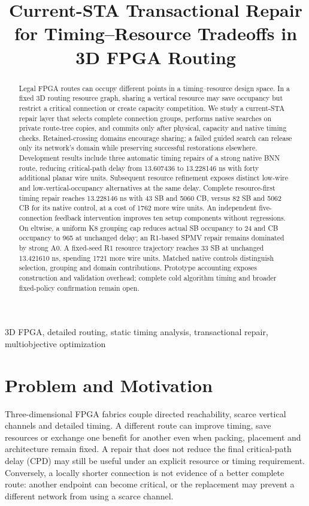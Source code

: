 \documentclass[conference,10pt]{IEEEtran}
\title{Current-STA Transactional Repair for Timing--Resource Tradeoffs in 3D FPGA Routing}
\author{\IEEEauthorblockN{Anonymous development manuscript}}
\begin{document}
\maketitle
\begin{abstract}
Legal FPGA routes can occupy different points in a timing--resource design space. In a fixed 3D routing resource graph, sharing a vertical resource may save occupancy but restrict a critical connection or create capacity competition. We study a current-STA repair layer that selects complete connection groups, performs native searches on private route-tree copies, and commits only after physical, capacity and native timing checks. Retained-crossing domains encourage sharing; a failed guided search can release only its network's domain while preserving successful restorations elsewhere. Development results include three automatic timing repairs of a strong native BNN route, reducing critical-path delay from 13.607436 to 13.228146 ns with forty additional planar wire units. Subsequent resource refinement exposes distinct low-wire and low-vertical-occupancy alternatives at the same delay. Complete resource-first timing repair reaches 13.228146 ns with 43 SB and 5060 CB, versus 82 SB and 5062 CB for its native control, at a cost of 1762 more wire units. An independent five-connection feedback intervention improves ten setup components without regressions. On eltwise, a uniform K8 grouping cap reduces actual SB occupancy to 24 and CB occupancy to 965 at unchanged delay; an R1-based SPMV repair remains dominated by strong A0. A fixed-seed R1 resource trajectory reaches 33 SB at unchanged 13.421610 ns, spending 1721 more wire units. Matched native controls distinguish selection, grouping and domain contributions. Prototype accounting exposes construction and validation overhead; complete cold algorithm timing and broader fixed-policy confirmation remain open.
\end{abstract}
\begin{IEEEkeywords}
3D FPGA, detailed routing, static timing analysis, transactional repair, multiobjective optimization
\end{IEEEkeywords}

\section{Problem and Motivation}
Three-dimensional FPGA fabrics couple directed reachability, scarce vertical channels and detailed timing. A different route can improve timing, save resources or exchange one benefit for another even when packing, placement and architecture remain fixed. A repair that does not reduce the final critical-path delay (CPD) may still be useful under an explicit resource or timing requirement. Conversely, a locally shorter connection is not evidence of a better complete route: another endpoint can become critical, or the replacement may prevent a different network from using a scarce channel.
\end{document}
